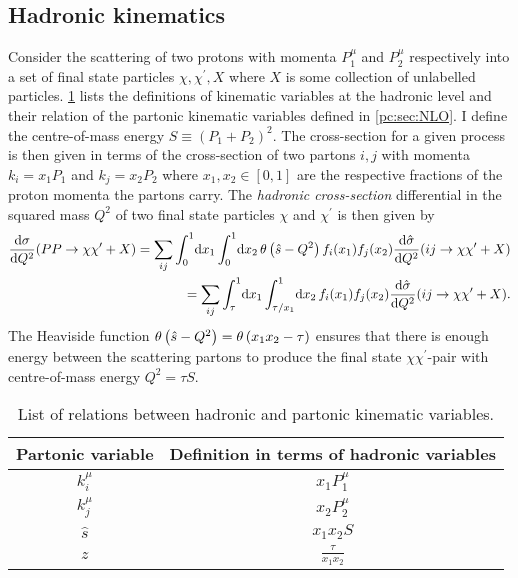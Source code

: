 \documentclass[../main.tex]{subfiles}
\begin{document}
\subsection{Hadronic kinematics}
Consider the scattering of two protons with momenta \(P_1^\mu\) and \(P_2^\mu\) respectively into a set of final state particles \(\chi, \chi^\prime, X\) where \(X\) is some collection of unlabelled particles.
\cref{had:tab:had_kinematic_variables} lists the definitions of kinematic variables at the hadronic level and their relation of the partonic kinematic variables defined in \cref{pc:sec:NLO}.
I define the centre-of-mass energy \(S \equiv (P_1 + P_2)^2\).
The cross-section for a given process is then given in terms of the cross-section of two partons \(i, j\) with momenta \(k_i = x_1 P_1\) and \(k_j = x_2 P_2\) where \(x_1, x_2 \in [0, 1]\) are the respective fractions of the proton momenta the partons carry.
The \emph{hadronic cross-section} differential in the squared mass \(Q^2\) of two final state particles \(\chi\) and \(\chi^\prime\) is then given by
\begin{align}
  \label{had:eq:dsigma_dQ2}
  \nonumber
  \d[Q^2]{\sigma}(PP \to \chi \chi^\prime + X) = \sum_ {ij} \integral[_0^1]{x_1}\!\integral[_0^1]{x_2} \theta\pclosed{\hat{s} - Q^2} f_i(x_1) f_j(x_2) \d[Q^2]{\hat\sigma}(ij \to \chi\chi^\prime + X) \\
  = \sum_ {ij} \integral[_\tau^1]{x_1}\!\integral[_{\tau/x_1}^1]{x_2} f_i(x_1) f_j(x_2) \d[Q^2]{\hat\sigma}(ij \to \chi\chi^\prime + X).
\end{align}
The Heaviside function \(\theta\left(\hat{s}-Q^2\right) = \theta\left(x_1 x_2 - \tau\right)\) ensures that there is enough energy between the scattering partons to produce the final state \(\chi \chi^\prime\)-pair with centre-of-mass energy \(Q^2 = \tau S\).

\begin{table}[ht!]
  \centering
  \begin{tabular}{|c|c|}
    \hline
    Partonic variable & Definition in terms of hadronic variables \\
    \hline
    \(k_i^\mu\)       & \(x_1 P_1^\mu\)                           \\
    \(k_j^\mu\)       & \(x_2 P_2^\mu\)                           \\
    \(\hat{s}\)       & \(x_1 x_2 S\)                             \\
    \(z\)             & \(\frac{\tau}{x_1x_2}\)                   \\
    \hline
  \end{tabular}
  \caption{List of relations between hadronic and partonic kinematic variables.}
  \label{had:tab:had_kinematic_variables}
\end{table}
\end{document}

